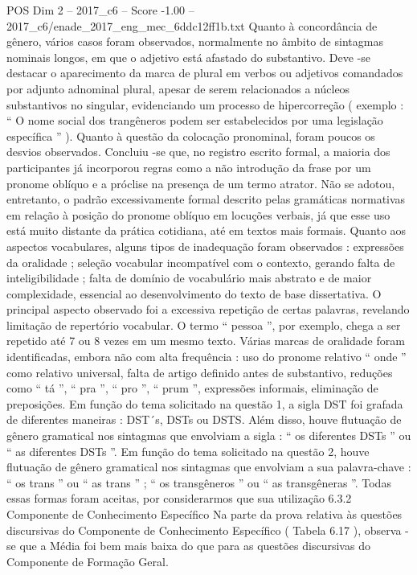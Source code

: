 \begin{textsample}{POS Dim 2 – 2017\_c6 – Score -1.00 – 2017\_c6/enade\_2017\_eng\_mec\_6ddc12ff1b.txt}
Quanto à concordância de gênero, vários casos foram observados, normalmente no âmbito de sintagmas nominais longos, em que o adjetivo está afastado do substantivo.
Deve -se destacar o aparecimento da marca de plural em verbos ou adjetivos comandados por adjunto adnominal plural, apesar de serem relacionados a núcleos substantivos no singular, evidenciando um processo de hipercorreção ( exemplo : “ O nome social dos trangêneros podem ser estabelecidos por uma legislação específica ” ).
Quanto à questão da colocação pronominal, foram poucos os desvios observados.
Concluiu -se que, no registro escrito formal, a maioria dos participantes já incorporou regras como a não introdução da frase por um pronome oblíquo e a próclise na presença de um termo atrator.
Não se adotou, entretanto, o padrão excessivamente formal descrito pelas gramáticas normativas em relação à posição do pronome oblíquo em locuções verbais, já que esse uso está muito distante da prática cotidiana, até em textos mais formais.
Quanto aos aspectos vocabulares, alguns tipos de inadequação foram observados : expressões da oralidade ; seleção vocabular incompatível com o contexto, gerando falta de inteligibilidade ; falta de domínio de vocabulário mais abstrato e de maior complexidade, essencial ao desenvolvimento do texto de base dissertativa.
O principal aspecto observado foi a excessiva repetição de certas palavras, revelando limitação de repertório vocabular.
O termo “ pessoa ”, por exemplo, chega a ser repetido até 7 ou 8 vezes em um mesmo texto.
Várias marcas de oralidade foram identificadas, embora não com alta frequência : uso do pronome relativo “ onde ” como relativo universal, falta de artigo definido antes de substantivo, reduções como “ tá ”, “ pra ”, “ pro ”, “ prum ”, expressões informais, eliminação de preposições.
Em função do tema solicitado na questão 1, a sigla DST foi grafada de diferentes maneiras : DST´s, DSTs ou DSTS.
Além disso, houve flutuação de gênero gramatical nos sintagmas que envolviam a sigla : “ os diferentes DSTs ” ou “ as diferentes DSTs ”.
Em função do tema solicitado na questão 2, houve flutuação de gênero gramatical nos sintagmas que envolviam a sua palavra-chave : “ os trans ” ou “ as trans ” ; “ os transgêneros ” ou “ as transgêneras ”.
Todas essas formas foram aceitas, por considerarmos que sua utilização 6.3.2 Componente de Conhecimento Específico Na parte da prova relativa às questões discursivas do Componente de Conhecimento Específico ( Tabela 6.17 ), observa -se que a Média foi bem mais baixa do que para as questões discursivas do Componente de Formação Geral.

\end{textsample}
